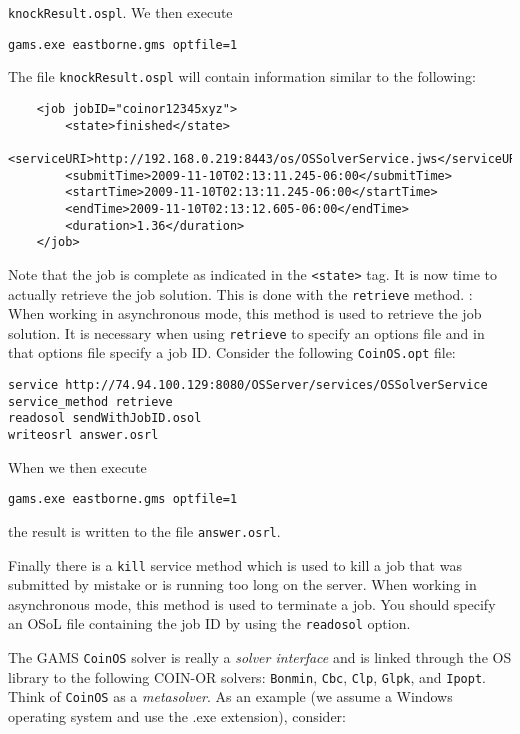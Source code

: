 {\tt knockResult.ospl}. We then execute
\vskip 8pt
\begin{verbatim}
gams.exe eastborne.gms optfile=1
\end{verbatim}
The file {\tt knockResult.ospl} will contain information similar to the following:
\begin{verbatim}
    <job jobID="coinor12345xyz">
        <state>finished</state>
        <serviceURI>http://192.168.0.219:8443/os/OSSolverService.jws</serviceURI>
        <submitTime>2009-11-10T02:13:11.245-06:00</submitTime>
        <startTime>2009-11-10T02:13:11.245-06:00</startTime>
        <endTime>2009-11-10T02:13:12.605-06:00</endTime>
        <duration>1.36</duration>
    </job>
\end{verbatim}
Note that the job is complete as indicated in the {\tt <state>} tag. It is now time to actually retrieve 
the job solution.  This is done with the {\tt retrieve} method.
\vskip 8pt
: When working in asynchronous mode, this method is used 
to retrieve the job solution. It is necessary when using {\tt retrieve} %
to specify an options file and in that options file specify a job ID.   
Consider the following {\tt CoinOS.opt} file:
\vskip 8pt
\begin{verbatim}
service http://74.94.100.129:8080/OSServer/services/OSSolverService
service_method retrieve
readosol sendWithJobID.osol
writeosrl answer.osrl
\end{verbatim}
When we then execute
\vskip 8pt
\begin{verbatim}
gams.exe eastborne.gms optfile=1
\end{verbatim}
the result is written to the file {\tt answer.osrl}. 

Finally there is a {\tt kill} service method which is used to kill a job that was submitted by mistake 
or is running too long on the server. 
\vskip 8pt
 When working in asynchronous mode, this method is used to terminate 
a job. You should specify an OSoL  file containing the job ID by using the {\tt readosol} option.
\vskip 8pt

\iffalse
{}\label{section:gamslocal}

   
The GAMS  {\tt CoinOS} solver is really a {\it solver interface} and is linked through the OS library to the 
following COIN-OR solvers: {\tt Bonmin}, {\tt Cbc}, {\tt Clp},  {\tt Glpk}, and {\tt Ipopt}. 
Think of {\tt CoinOS} as a {\it metasolver}.    As an example (we assume a Windows operating system 
and use the .exe extension), consider:

